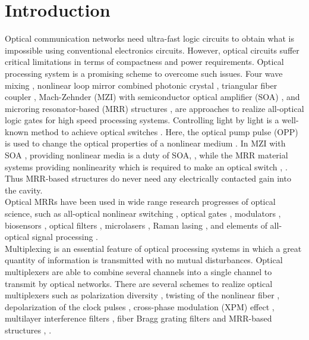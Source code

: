 \documentclass{osa-article}
\begin{document}
\section{Introduction}
\label{}
Optical communication networks need ultra-fast logic circuits to obtain what is impossible using conventional electronics circuits. However, optical circuits suffer critical limitations in terms of compactness and power requirements. Optical processing system is a promising scheme to overcome such issues. Four wave mixing \cite{hu2014all}, nonlinear loop mirror combined photonic crystal \cite{sharma2015numerical}, triangular fiber coupler \cite{menezes2012numerical}, Mach-Zehnder (MZI) with semiconductor optical amplifier (SOA) \cite{kotb2017performance}, \cite{kotb2018all} and microring resonator-based (MRR) structures \cite{lalehsimulation}, \cite{rakshit2014micro} are approaches to realize all-optical logic gates for high speed processing systems. Controlling light by light is a well-known method to achieve optical switches \cite{rakshit2013design}. Here, the optical pump pulse (OPP) is used to change the optical properties of a nonlinear medium \cite{wang2012simulative}. In MZI with SOA \cite{dimitriadou2013feasibility}, providing nonlinear media is a duty of SOA, \cite{houbavlis2003soa}, while the MRR material systems providing nonlinearity which is required to make an optical switch \cite{li2012theoretical}, \cite{heebner1999enhanced}. Thus MRR-based structures do never need any electrically contacted gain into the cavity.\\
Optical MRRs have been used in wide range research progresses of optical science, such as all-optical nonlinear switching \cite{forst2007high}, optical gates \cite{ibrahim2003all}, modulators \cite{tazawa2006ring}, biosensors \cite{de2007silicon}, optical filters \cite{tobing2008boxlike}, microlasers \cite{benson2006micro}, Raman lasing \cite{de2013design}, and  elements of all-optical signal processing \cite{van2002optical}.\\
Multiplexing \cite{schwelb2006crosstalk} is an essential feature of optical processing systems in which a great quantity of information is transmitted with no mutual disturbances. Optical multiplexers are able to combine several channels into a single channel to transmit by optical networks. There are several schemes to realize optical multiplexers \cite{wu2012proposal} such as polarization diversity \cite{shen2008reconfigurable}, twisting of the nonlinear fiber \cite{xu2011reconfigurable}, depolarization of the clock pulses \cite{ismail2011all}, cross-phase modulation (XPM) effect \cite{lin1999investigation}, multilayer interference filters \cite{roy2014design},  fiber Bragg grating filters \cite{zoiros2005complete} and MRR-based structures \cite{lalehsimulation}, \cite{rakshit2013design}.\\
\end{document}
